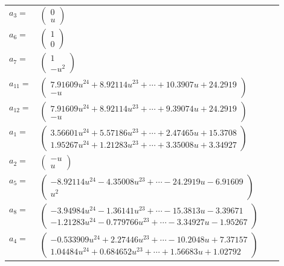 \documentclass[1p]{elsarticle_modified}
\theoremstyle{definition}
\begin{document}
\begin{tabular}{m{7pt} m{180pt} m{7pt} m{180pt} }
\flushright $a_{3}=$&$\begin{pmatrix}0\\u\end{pmatrix}$ \\
\flushright $a_{6}=$&$\begin{pmatrix}1\\0\end{pmatrix}$ \\
\flushright $a_{7}=$&$\begin{pmatrix}1\\- u^2\end{pmatrix}$ \\
\flushright $a_{11}=$&$\begin{pmatrix}7.91609 u^{24}+8.92114 u^{23}+\cdots+10.3907 u+24.2919\\- u\end{pmatrix}$ \\
\flushright $a_{12}=$&$\begin{pmatrix}7.91609 u^{24}+8.92114 u^{23}+\cdots+9.39074 u+24.2919\\- u\end{pmatrix}$ \\
\flushright $a_{1}=$&$\begin{pmatrix}3.56601 u^{24}+5.57186 u^{23}+\cdots+2.47465 u+15.3708\\1.95267 u^{24}+1.21283 u^{23}+\cdots+3.35008 u+3.34927\end{pmatrix}$ \\
\flushright $a_{2}=$&$\begin{pmatrix}- u\\u\end{pmatrix}$ \\
\flushright $a_{5}=$&$\begin{pmatrix}-8.92114 u^{24}-4.35008 u^{23}+\cdots-24.2919 u-6.91609\\u^2\end{pmatrix}$ \\
\flushright $a_{8}=$&$\begin{pmatrix}-3.94984 u^{24}-1.36141 u^{23}+\cdots-15.3813 u-3.39671\\-1.21283 u^{24}-0.779766 u^{23}+\cdots-3.34927 u-1.95267\end{pmatrix}$ \\
\flushright $a_{4}=$&$\begin{pmatrix}-0.533909 u^{24}+2.27446 u^{23}+\cdots-10.2048 u+7.37157\\1.04484 u^{24}+0.684652 u^{23}+\cdots+1.56683 u+1.02792\end{pmatrix}$ \\

\end{tabular}
\end{document}
